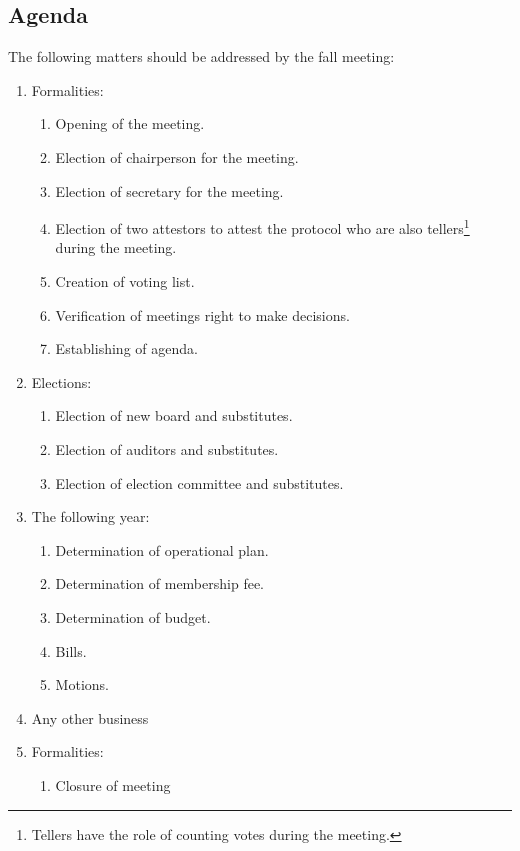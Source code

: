 \subsection{Agenda}
The following matters should be addressed by the fall meeting:
\begin{enumerate}
  \item Formalities:
  \begin{enumerate}
    \item Opening of the meeting.
    \item Election of chairperson for the meeting.
    \item Election of secretary for the meeting.
    \item Election of two attestors to attest the protocol who are also tellers\footnote{Tellers have the role of counting votes during the meeting.} during the meeting.
    \item Creation of voting list.
    \item Verification of meetings right to make decisions.
    \item Establishing of agenda.
  \end{enumerate}
  \item Elections:
  \begin{enumerate}
    \item Election of new board and substitutes.
    \item Election of auditors and substitutes.
    \item Election of election committee and substitutes.
  \end{enumerate}
  \item The following year:
  \begin{enumerate}
    \item Determination of operational plan.
    \item Determination of membership fee.
    \item Determination of budget.
    \item Bills.
    \item Motions.
  \end{enumerate}
  \item Any other business
  \item Formalities:
  \begin{enumerate}
    \item Closure of meeting
  \end{enumerate}
\end{enumerate}

